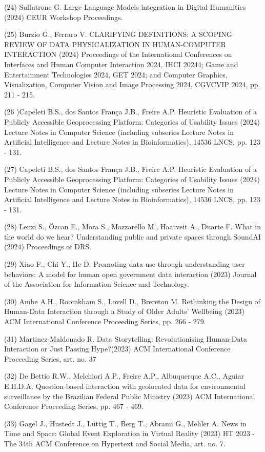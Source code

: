 \documentclass[
	12pt,				%
	oneside,			%
	a4paper,			%
	english,			%
	brazil				%
	]{abntex2ppgsi}
\begin{document}
\begin{apendicesenv}
(24) Sullutrone G. Large Language Models integration in Digital Humanities (2024) CEUR Workshop Proceedings.

(25) Burzio G., Ferraro V. CLARIFYING DEFINITIONS: A SCOPING REVIEW OF DATA PHYSICALIZATION IN HUMAN-COMPUTER INTERACTION (2024) Proceedings of the International Conferences on Interfaces and Human Computer Interaction 2024, IHCI 20244; Game and Entertainment Technologies 2024, GET 2024; and Computer Graphics, Visualization, Computer Vision and Image Processing 2024, CGVCVIP 2024, pp. 211 - 215.

(26 )Capeleti B.S., dos Santos França J.B., Freire A.P. Heuristic Evaluation of a Publicly Accessible Geoprocessing Platform: Categories of Usability Issues (2024) Lecture Notes in Computer Science (including subseries Lecture Notes in Artificial Intelligence and Lecture Notes in Bioinformatics), 14536 LNCS, pp. 123 - 131.

(27) Capeleti B.S., dos Santos França J.B., Freire A.P. Heuristic Evaluation of a Publicly Accessible Geoprocessing Platform: Categories of Usability Issues (2024) Lecture Notes in Computer Science (including subseries Lecture Notes in Artificial Intelligence and Lecture Notes in Bioinformatics), 14536 LNCS, pp. 123 - 131.

(28) Lenzi S., Özcan E., Mora S., Mazzarello M., Haatveit A., Duarte F. What in the world do we hear? Understanding public and private spaces through SoundAI (2024) Proceedings of DRS.

(29) Xiao F., Chi Y., He D. Promoting data use through understanding user behaviors: A model for human open government data interaction (2023) Journal of the Association for Information Science and Technology.

(30) Ambe A.H., Roomkham S., Lovell D., Brereton M. Rethinking the Design of Human-Data Interaction through a Study of Older Adults' Wellbeing (2023) ACM International Conference Proceeding Series, pp. 266 - 279.


(31) Martinez-Maldonado R. Data Storytelling: Revolutionising Human-Data Interaction or Just Passing Hype?(2023) ACM International Conference Proceeding Series, art. no. 37

(32) De Bettio R.W., Melchiori A.P., Freire A.P., Albuquerque A.C., Aguiar E.H.D.A. Question-based interaction with geolocated data for environmental surveillance by the Brazilian Federal Public Ministry (2023) ACM International Conference Proceeding Series, pp. 467 - 469.

(33) Gagel J., Hustedt J., Lüttig T., Berg T., Abrami G., Mehler A. News in Time and Space: Global Event Exploration in Virtual Reality (2023) HT 2023 - The 34th ACM Conference on Hypertext and Social Media, art. no. 7.


\end{apendicesenv}
\end{document}
